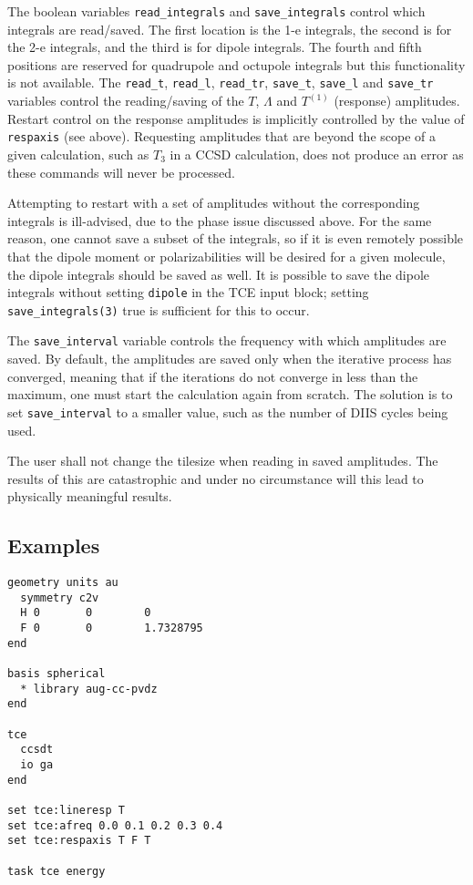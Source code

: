 The boolean variables \verb+read_integrals+ and \verb+save_integrals+ control which integrals are read/saved.  The first location is the 1-e integrals, the second is for the 2-e integrals, and the third is for dipole integrals.  The fourth and fifth positions are reserved for quadrupole and octupole integrals but this functionality is not available.  The \verb+read_t+, \verb+read_l+, \verb+read_tr+, \verb+save_t+, \verb+save_l+ and \verb+save_tr+ variables control the reading/saving of the $T$, $\Lambda$ and $T^{(1)}$ (response) amplitudes.  Restart control on the response amplitudes is implicitly controlled by the value of \verb+respaxis+ (see above).  Requesting amplitudes that are beyond the scope of a given calculation, such as $T_3$ in a CCSD calculation, does not produce an error as these commands will never be processed.

Attempting to restart with a set of amplitudes without the corresponding integrals is ill-advised, due to the phase issue discussed above.  For the same reason, one cannot save a subset of the integrals, so if it is even remotely possible that the dipole moment or polarizabilities will be desired for a given molecule, the dipole integrals should be saved as well.  It is possible to save the dipole integrals without setting \verb+dipole+ in the TCE input block; setting \verb+save_integrals(3)+ true is sufficient for this to occur.

The \verb+save_interval+ variable controls the frequency with which amplitudes are saved.  By default, the amplitudes are saved only when the iterative process has converged, meaning that if the iterations do not converge in less than the maximum, one must start the calculation again from scratch.  The solution is to set \verb+save_interval+ to a smaller value, such as the number of DIIS cycles being used.

The user shall not change the tilesize when reading in saved amplitudes.  The results of this are catastrophic and under no circumstance will this lead to physically meaningful results.

\subsection{Examples}

\begin{verbatim}
geometry units au
  symmetry c2v
  H 0       0        0
  F 0       0        1.7328795
end

basis spherical
  * library aug-cc-pvdz
end

tce
  ccsdt
  io ga
end

set tce:lineresp T
set tce:afreq 0.0 0.1 0.2 0.3 0.4
set tce:respaxis T F T

task tce energy
\end{verbatim}

